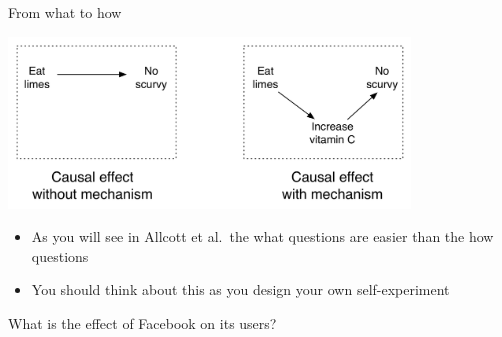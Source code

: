 \documentclass[aspectratio=169]{beamer}
\begin{document}
\begin{frame}

From what to how
\begin{center}
\includegraphics[width=0.8\textwidth]{figures/bitbybit4-10_mechanism_schematic}
\end{center}

\begin{itemize}
\item As you will see in Allcott et al.\ the what questions are easier than the how questions \pause
\item You should think about this as you design your own self-experiment
\end{itemize}

\end{frame}
\begin{frame}

What is the effect of Facebook on its users?

\end{frame}
\end{document}
